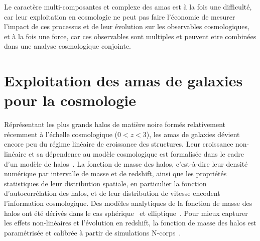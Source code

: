Le caractère multi-composantes et complexe des amas est à la fois une
difficulté, car leur exploitation en cosmologie ne peut pas faire
l'économie de mesurer l'impact de ces processus et de leur évolution
sur les observables cosmologiques, et à la fois une force, car ces
observables sont multiples et peuvent etre combinées dans une analyse
cosmologique conjointe.

\section{Exploitation des amas de galaxies pour la cosmologie}
\label{se:sondecosmo}

Réprésentant les plus grands halos de matière noire formés
relativement récemment à l'échelle cosmologique ($0<z<3$), les amas de
galaxies dévient encore peu du régime linéaire de croissance des structures.
Leur croissance non-linéaire et sa dépendence au modèle cosmologique
est formalisée dans le cadre d'un modèle de halos~\citep[, par exemple
  pour une revue]{Cooray2002}. La fonction de masse des halos,
c'est-à-dire leur densité numérique par intervalle de masse et de
redshift, ainsi que les propriétés statistiques de leur distribution
spatiale, en particulier la fonction d'autocorrélation des halos, et
de leur distribution de vitesse encodent l'information
cosmologique. Des modèles analytiques de la fonction de masse des
halos ont été dérivés dans le cas sphérique~\citep{Press-Schechter1974}
et elliptique~\citep{Sheth2001}. Pour mieux capturer les effets
non-linéaires et l'évolution en redshift, la fonction de masse des
halos est paramétrisée et calibrée à partir de simulations
N-corps~\citep{Tinker2008}.

